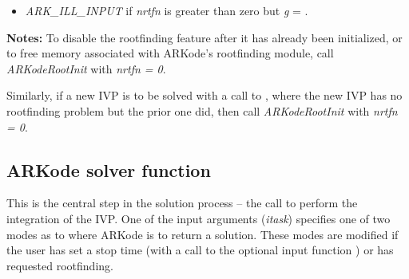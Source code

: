 \documentclass[letterpaper,10pt,english]{sphinxmanual}
\begin{document}
\begin{fulllineitems}
\begin{description}
\begin{itemize}
\item {} 
\emph{ARK\_ILL\_INPUT} if \emph{nrtfn} is greater than zero but \emph{g} = .

\end{itemize}

\end{description}

\textbf{Notes:} To disable the rootfinding feature after it has already
been initialized, or to free memory associated with ARKode's
rootfinding module, call \emph{ARKodeRootInit} with \emph{nrtfn = 0}.

Similarly, if a new IVP is to be solved with a call to
{\hyperref[c_interface/User_callable:ARKodeReInit]{}}, where the new IVP has no rootfinding
problem but the prior one did, then call \emph{ARKodeRootInit} with
\emph{nrtfn = 0}.

\end{fulllineitems}



\subsection{ARKode solver function}
\label{c_interface/User_callable:arkode-solver-function}\label{c_interface/User_callable:cinterface-integration}
This is the central step in the solution process -- the call to perform
the integration of the IVP.  One of the input arguments (\emph{itask})
specifies one of two modes as to where ARKode is to return a
solution.  These modes are modified if the user has set a stop time
(with a call to the optional input function {\hyperref[c_interface/User_callable:ARKodeSetStopTime]{}}) or
has requested rootfinding.
\end{document}
